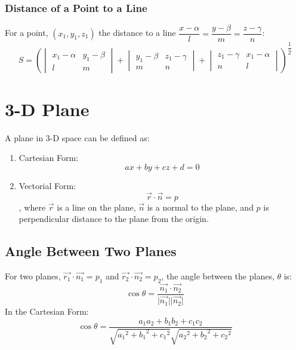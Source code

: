 \documentclass[openany, oneside]{book}
\begin{document}
\subsection{Distance of a Point to a Line\newline}
For a point, $(x_1,y_1,z_1)$ the distance to a line $\dfrac{x-\alpha}{l}=\dfrac{y-\beta}{m}=\dfrac{z-\gamma}{n}$:
\begin{equation}
S=\left(
\begin{vmatrix}
x_1-\alpha&y_1-\beta\\
l&m
\end{vmatrix}+
\begin{vmatrix}
y_1-\beta&z_1-\gamma\\
m&n
\end{vmatrix}+
\begin{vmatrix}
z_1-\gamma&x_1-\alpha\\
n&l
\end{vmatrix}
\right)^{\dfrac{1}{2}}
\end{equation}

\large{\chapter{3-D Plane}}
A plane in 3-D space can be defined as:
\begin{enumerate}
\item Cartesian Form: \begin{equation} ax+by+cz+d=0 \end{equation}
\item Vectorial Form: \begin{equation}\vec{r}\cdot\vec{n}=p\end{equation}, where $\vec{r}$ is a line on the plane, $\vec{n}$ is a normal to the plane, and $p$ is perpendicular distance to the plane from the origin.
\end{enumerate}

\section{Angle Between Two Planes}
For two planes, $\vec{r_1}\cdot\vec{n_1}=p_1$ and $\vec{r_2}\cdot\vec{n_2}=p_2$, the angle between the planes, $\theta$ is:
\begin{equation}
\cos \theta=\dfrac{\vec{n_1}\cdot\vec{n_2}}{\lvert \vec{n_1} \rvert \lvert \vec{n_2} \rvert}
\end{equation}
In the Cartesian Form:
\begin{equation}
\cos \theta = \dfrac{a_1a_2+b_1b_2+c_1c_2}{\sqrt{{a_1}^2+{b_1}^2+{c_1}^2}\sqrt{{a_2}^2+{b_2}^2+{c_2}^2}}
\end{equation}
\end{document}
